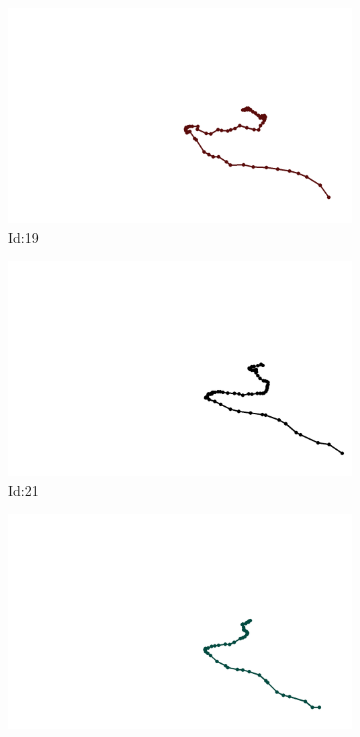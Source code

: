\documentclass[12pt,twoside]{report}
\begin{document}
\begin{figure}
\centering
\begin{subfigure}[b]{0.20\textwidth}
\centering
\includegraphics[width=\textwidth]{../trajectories/19.png}
\caption{Id:19}
\end{subfigure}
\begin{subfigure}[b]{0.20\textwidth}
\centering
\includegraphics[width=\textwidth]{../trajectories/21.png}
\caption{Id:21}
\end{subfigure}
\begin{subfigure}[b]{0.20\textwidth}
\centering
\includegraphics[width=\textwidth]{../trajectories/38.png}

\end{subfigure}
\end{figure}
\end{document}
